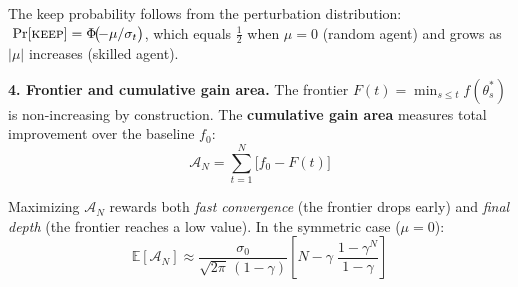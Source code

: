 \documentclass[10pt,a4paper]{article}
\begin{document}
\vspace{0.2em}

\noindent The keep probability follows from the perturbation distribution:
$\;\Pr[\textsc{keep}] = \Phi\!\bigl(\!-\mu/\sigma_t\bigr)$,\;
which equals $\frac{1}{2}$ when $\mu\!=\!0$ (random agent) and grows as $|\mu|$ increases (skilled agent).

\vspace{0.5em}

\noindent\textbf{4.\; Frontier and cumulative gain area.}\;
The frontier $F(t) = \min_{s \leq t} f(\theta^*_s)$ is non-increasing by construction.
The \textbf{cumulative gain area} measures total improvement over the baseline $f_0$:
%
\begin{equation*}
\boxed{\;\mathcal{A}_N = \sum_{t=1}^{N}\bigl[f_0 - F(t)\bigr]\;}
\end{equation*}

Maximizing $\mathcal{A}_N$ rewards both \emph{fast convergence} (the frontier drops early) and \emph{final depth}
(the frontier reaches a low value). In the symmetric case ($\mu\!=\!0$):
%
\begin{equation*}
\mathbb{E}[\mathcal{A}_N] \approx \frac{\sigma_0}{\sqrt{2\pi}\,(1-\gamma)}\left[N - \gamma\;\frac{1-\gamma^N}{1-\gamma}\right]
\end{equation*}
\end{document}

